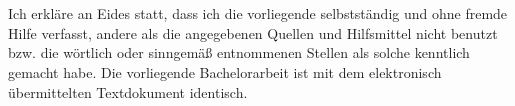 

\chapter*{\statement}

Ich erkläre an Eides statt, dass ich die vorliegende  selbstständig und ohne fremde Hilfe verfasst, andere als die angegebenen Quellen und Hilfsmittel nicht benutzt bzw. die wörtlich oder sinngemäß entnommenen Stellen als solche kenntlich gemacht habe. Die vorliegende Bachelorarbeit ist mit dem elektronisch übermittelten Textdokument identisch.